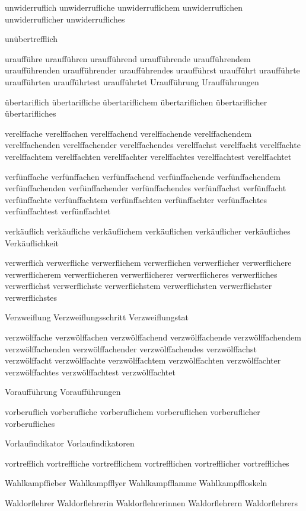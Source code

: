 unwiderruflich unwiderrufliche unwiderruflichem unwiderruflichen unwiderruflicher unwiderrufliches

unübertrefflich

uraufführe uraufführen uraufführend uraufführende uraufführendem uraufführenden uraufführender uraufführendes uraufführst uraufführt uraufführte uraufführten uraufführtest uraufführtet Uraufführung Uraufführungen

übertariflich übertarifliche übertariflichem übertariflichen übertariflicher übertarifliches

verelffache verelffachen verelffachend verelffachende verelffachendem verelffachenden verelffachender verelffachendes verelffachst verelffacht verelffachte verelffachtem verelffachten verelffachter verelffachtes verelffachtest verelffachtet

verfünffache verfünffachen verfünffachend verfünffachende verfünffachendem verfünffachenden verfünffachender verfünffachendes verfünffachst verfünffacht verfünffachte verfünffachtem verfünffachten verfünffachter verfünffachtes verfünffachtest verfünffachtet

verkäuflich verkäufliche verkäuflichem verkäuflichen verkäuflicher verkäufliches Verkäuflichkeit

verwerflich verwerfliche verwerflichem verwerflichen verwerflicher verwerflichere verwerflicherem verwerflicheren verwerflicherer verwerflicheres verwerfliches verwerflichst verwerflichste verwerflichstem verwerflichsten verwerflichster verwerflichstes

Verzweiflung Verzweiflungsschritt Verzweiflungstat

verzwölffache verzwölffachen verzwölffachend verzwölffachende verzwölffachendem verzwölffachenden verzwölffachender verzwölffachendes verzwölffachst verzwölffacht verzwölffachte verzwölffachtem verzwölffachten verzwölffachter verzwölffachtes verzwölffachtest verzwölffachtet

Voraufführung Voraufführungen

vorberuflich vorberufliche vorberuflichem vorberuflichen vorberuflicher vorberufliches

Vorlaufindikator Vorlaufindikatoren

vortrefflich vortreffliche vortrefflichem vortrefflichen vortrefflicher vortreffliches

Wahlkampffieber Wahlkampfflyer Wahlkampfflamme Wahlkampffloskeln 

Waldorflehrer Waldorflehrerin Waldorflehrerinnen Waldorflehrern Waldorflehrers

